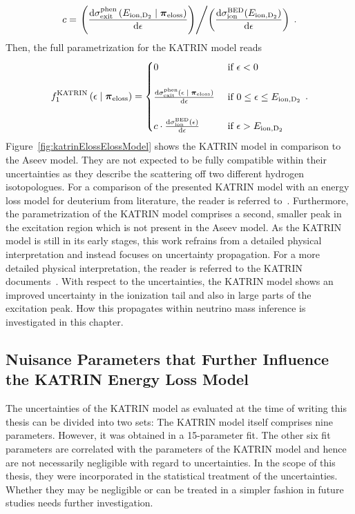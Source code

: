 \begin{equation}
c = \left.	
	\left(
		\katrinElossPhen{\ionEnergyDeu}
	\right)
\middle/
	\left(
		\katrinElossBDE{\ionEnergyDeu}
	\right)
\right.
\fullstop
\end{equation}
Then, the full parametrization for the KATRIN model reads~\cite{Hannen2019_1}
\begin{equation}
	f_1^\mathrm{KATRIN}
	\giventhat*{\epsilon}{\nuisanceParamVec_\mathrm{eloss}} = 
	\begin{cases}
	0
	&\text{ if } \epsilon < 0 \\
	\vphantom{\scriptscriptstyle .} & \\
	\katrinElossPhen{\epsilon}
	&\text{ if } 0 \leq \epsilon \leq E_\mathrm{ion,D_2} \\
	\vphantom{\scriptscriptstyle .} & \\
	c \cdot \katrinElossBDE{\epsilon} 
	&\text{ if } \epsilon > E_\mathrm{ion,D_2}
	\end{cases}
	\fullstop
\end{equation}
Figure~\ref{fig:katrinElossElossModel} shows the KATRIN model in comparison to the Aseev model. They are not expected to be fully compatible within their uncertainties as they describe the scattering off two different hydrogen isotopologues. For a comparison of the presented KATRIN model with an energy loss model for deuterium from literature, the reader is referred to~\cite{Rodenbeck2019}. Furthermore, the parametrization of the KATRIN model comprises a second, smaller peak in the excitation region which is not present in the Aseev model. As the KATRIN model is still in its early stages, this work refrains from a detailed physical interpretation and instead focuses on uncertainty propagation. For a more detailed physical interpretation, the reader is referred to the KATRIN documents~\cite{Rodenbeck2019,Hannen2019_1,Hannen2019_2}. With respect to the uncertainties, the KATRIN model shows an improved uncertainty in the ionization tail and also in large parts of the excitation peak. How this propagates within neutrino mass inference is investigated in this chapter.

\subsection{Nuisance Parameters that Further Influence the KATRIN Energy Loss Model}
The uncertainties of the KATRIN model as evaluated at the time of writing this thesis can be divided into two sets: The KATRIN model itself comprises nine parameters. However, it was obtained in a 15-parameter fit. The other six fit parameters are correlated with the parameters of the KATRIN model and hence are not necessarily negligible with regard to uncertainties. In the scope of this thesis, they were incorporated in the statistical treatment of the uncertainties. Whether they may be negligible or can be treated in a simpler fashion in future studies needs further investigation. 

